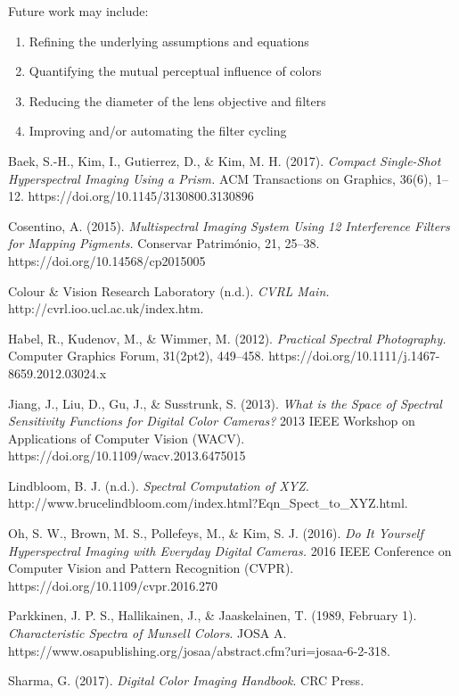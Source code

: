 \documentclass[twocolumn,10pt]{asme2ej}
\newcommand{\id}{\hspace{6 mm}}
\begin{document}
\id Future work may include:

\begin{enumerate}
\item Refining the underlying assumptions and equations
\item Quantifying the mutual perceptual influence of colors
\item Reducing the diameter of the lens objective and filters 
\item Improving and/or automating the filter cycling
\end{enumerate}


 \begin{thebibliography}{12}

{Baek, S.-H., Kim, I., Gutierrez, D., \& Kim, M. H. (2017). \emph{Compact Single-Shot Hyperspectral Imaging Using a Prism.} ACM Transactions on Graphics, 36(6), 1–12. https://doi.org/10.1145/3130800.3130896}

{Cosentino, A. (2015). \emph{Multispectral Imaging System Using 12 Interference Filters for Mapping Pigments.} Conservar Património, 21, 25–38. https://doi.org/10.14568/cp2015005}

{Colour \& Vision Research Laboratory (n.d.). \emph{CVRL Main.} http://cvrl.ioo.ucl.ac.uk/index.htm.}

{Habel, R., Kudenov, M., \& Wimmer, M. (2012). \emph{Practical Spectral Photography.} Computer Graphics Forum, 31(2pt2), 449–458. https://doi.org/10.1111/j.1467-8659.2012.03024.x}

{Jiang, J., Liu, D., Gu, J., \& Susstrunk, S. (2013). \emph{What is the Space of Spectral Sensitivity Functions for Digital Color Cameras?} 2013 IEEE Workshop on Applications of Computer Vision (WACV). https://doi.org/10.1109/wacv.2013.6475015}

{Lindbloom, B. J. (n.d.). \emph{Spectral Computation of XYZ.} http://www.brucelindbloom.com/index.html?Eqn\_Spect\_to\_XYZ.html.}

{Oh, S. W., Brown, M. S., Pollefeys, M., \& Kim, S. J. (2016). \emph{Do It Yourself Hyperspectral Imaging with Everyday Digital Cameras.} 2016 IEEE Conference on Computer Vision and Pattern Recognition (CVPR). https://doi.org/10.1109/cvpr.2016.270}

 {Parkkinen, J. P. S., Hallikainen, J., \& Jaaskelainen, T. (1989, February 1). \emph{Characteristic Spectra of Munsell Colors}. JOSA A. https://www.osapublishing.org/josaa/abstract.cfm?uri=josaa-6-2-318.}

{Sharma, G. (2017). \emph{Digital Color Imaging Handbook}. CRC Press.}

\end{thebibliography}
 
\end{document}
